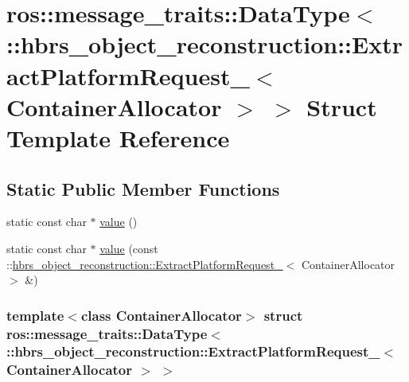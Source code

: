 \hypertarget{structros_1_1message__traits_1_1_data_type_3_01_1_1hbrs__object__reconstruction_1_1_extract_platba4865a04dbdc83b21722f3becd58b36}{\section{ros\-:\-:message\-\_\-traits\-:\-:\-Data\-Type$<$ \-:\-:hbrs\-\_\-object\-\_\-reconstruction\-:\-:\-Extract\-Platform\-Request\-\_\-$<$ \-Container\-Allocator $>$ $>$ \-Struct \-Template \-Reference}
\label{structros_1_1message__traits_1_1_data_type_3_01_1_1hbrs__object__reconstruction_1_1_extract_platba4865a04dbdc83b21722f3becd58b36}
}
\subsection*{\-Static \-Public \-Member \-Functions}
\begin{DoxyCompactItemize}
\item 
static const char $\ast$ \hyperlink{structros_1_1message__traits_1_1_data_type_3_01_1_1hbrs__object__reconstruction_1_1_extract_platba4865a04dbdc83b21722f3becd58b36_a20ec3c68f2119dc0c3f7088d0e65fc66}{value} ()
\item 
static const char $\ast$ \hyperlink{structros_1_1message__traits_1_1_data_type_3_01_1_1hbrs__object__reconstruction_1_1_extract_platba4865a04dbdc83b21722f3becd58b36_ae6a9227e9e3d94eba1e48cd51e802276}{value} (const \-::\hyperlink{structhbrs__object__reconstruction_1_1_extract_platform_request__}{hbrs\-\_\-object\-\_\-reconstruction\-::\-Extract\-Platform\-Request\-\_\-}$<$ \-Container\-Allocator $>$ \&)
\end{DoxyCompactItemize}
\subsubsection*{template$<$class Container\-Allocator$>$ struct ros\-::message\-\_\-traits\-::\-Data\-Type$<$ \-::hbrs\-\_\-object\-\_\-reconstruction\-::\-Extract\-Platform\-Request\-\_\-$<$ Container\-Allocator $>$ $>$}



